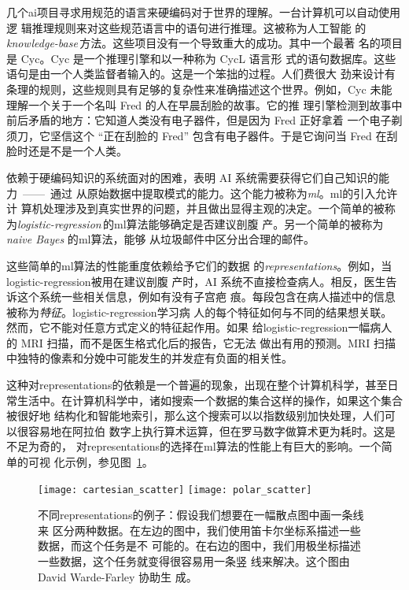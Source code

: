 几个\gls*{ai}项目寻求用规范的语言来硬编码对于世界的理解。一台计算机可以自动使用逻
辑推理规则来对这些规范语言中的语句进行推理。这被称为人工智能
的\emph{\gls{knowledge-base}}\,方法。这些项目没有一个导致重大的成功。其中一个最著
名的项目是 Cyc\citep{Lenat-1989-book}。Cyc 是一个推理引擎和以一种称为 CycL 语言形
式的语句数据库。这些语句是由一个人类监督者输入的。这是一个笨拙的过程。人们费很大
劲来设计有条理的规则，这些规则具有足够的复杂性来准确描述这个世界。例如，Cyc 未能
理解一个关于一个名叫 Fred 的人在早晨刮脸的故事\citep{MachineChangedWorld}。它的推
理引擎检测到故事中前后矛盾的地方：它知道人类没有电子器件，但是因为 Fred 正好拿着
一个电子剃须刀，它坚信这个 ``正在刮脸的 Fred'' 包含有电子器件。于是它询问当 Fred
在刮脸时还是不是一个人类。

依赖于硬编码知识的系统面对的困难，表明 AI 系统需要获得它们自己知识的能力~——~通过
从原始数据中提取模式的能力。这个能力被称为\emph{\gls{ml}}。\gls*{ml}的引入允许计
算机处理涉及到真实世界的问题，并且做出显得主观的决定。一个简单的被称
为\emph{\gls{logistic-regression}}\,的\gls*{ml}算法能够确定是否建议剖腹
产\citep{MorYosef90}。另一个简单的被称为 \emph{naive Bayes} 的\gls*{ml}算法，能够
从垃圾邮件中区分出合理的邮件。

这些简单的\gls*{ml}算法的性能重度依赖给予它们的数据
的\emph{\gls{representations}}。例如，当\gls*{logistic-regression}被用在建议剖腹
产时，AI 系统不直接检查病人。相反，医生告诉这个系统一些相关信息，例如有没有子宫疤
痕。每段包含在病人描述中的信息被称为\emph{特征}。\gls*{logistic-regression}学习病
人的每个特征如何与不同的结果想关联。然而，它不能对任意方式定义的特征起作用。如果
给\gls*{logistic-regression}一幅病人的 MRI 扫描，而不是医生格式化后的报告，它无法
做出有用的预测。MRI 扫描中独特的像素和分娩中可能发生的并发症有负面的相关性。

这种对\gls*{representations}的依赖是一个普遍的现象，出现在整个计算机科学，甚至日
常生活中。在计算机科学中，诸如搜索一个数据的集合这样的操作，如果这个集合被很好地
结构化和智能地索引，那么这个搜索可以以指数级别加快处理，人们可以很容易地在阿拉伯
数字上执行算术运算，但在罗马数字做算术更为耗时。这是不足为奇的，
对\gls*{representations}的选择在\gls*{ml}算法的性能上有巨大的影响。一个简单的可视
化示例，参见图~\ref{fig:different_representations}。

\begin{figure}[h]
  \centering
  \texttt{[image: cartesian\_scatter]}
  \texttt{[image: polar\_scatter]}
  \caption{不同\gls*{representations}的例子：假设我们想要在一幅散点图中画一条线来
    区分两种数据。在左边的图中，我们使用笛卡尔坐标系描述一些数据，而这个任务是不
    可能的。在右边的图中，我们用极坐标描述一些数据，这个任务就变得很容易用一条竖
    线来解决。这个图由 David Warde-Farley 协助生
    成。\label{fig:different_representations}}
\end{figure}

